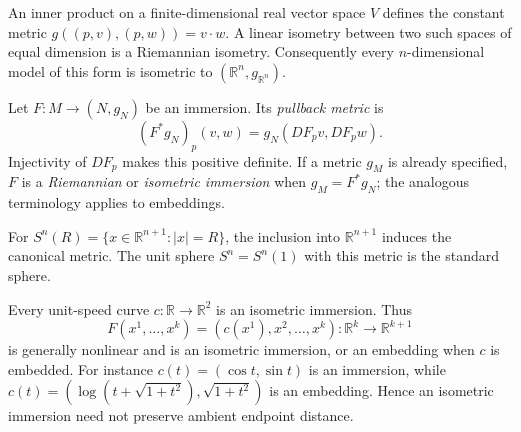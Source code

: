 \begin{example}
  \label{ex:pet-ch1-inner-product-space}


  An inner product on a finite-dimensional real vector space $V$ defines the
  constant metric $g((p,v),(p,w))=v\cdot w$. A linear isometry between two
  such spaces of equal dimension is a Riemannian isometry. Consequently every
  $n$-dimensional model of this form is isometric to
  $(\mathbb{R}^n,g_{\mathbb{R}^n})$.
\end{example}

\begin{definition}
  \label{def:pet-ch1-pullback-metric}


  Let $F:M\to(N,g_N)$ be an immersion. Its \emph{pullback metric} is
  \[
    (F^*g_N)_p(v,w)=g_N(DF_pv,DF_pw).
  \]
  Injectivity of $DF_p$ makes this positive definite. If a metric $g_M$ is
  already specified, $F$ is a \emph{Riemannian} or \emph{isometric immersion}
  when $g_M=F^*g_N$; the analogous terminology applies to embeddings.
\end{definition}

\begin{example}
  \label{ex:pet-ch1-sphere}


  For
  $S^n(R)=\{x\in\mathbb{R}^{n+1}:|x|=R\}$, the inclusion into
  $\mathbb{R}^{n+1}$ induces the canonical metric. The unit sphere
  $S^n=S^n(1)$ with this metric is the standard sphere.
\end{example}

\begin{remark}
  \label{rem:pet-ch1-nonlinear-isometric-immersion}


  Every unit-speed curve $c:\mathbb{R}\to\mathbb{R}^2$ is an isometric
  immersion. Thus
  \[
    F(x^1,\ldots,x^k)=(c(x^1),x^2,\ldots,x^k)
      :\mathbb{R}^k\to\mathbb{R}^{k+1}
  \]
  is generally nonlinear and is an isometric immersion, or an embedding when
  $c$ is embedded. For instance $c(t)=(\cos t,\sin t)$ is an immersion, while
  $c(t)=(\log(t+\sqrt{1+t^2}),\sqrt{1+t^2})$ is an embedding. Hence an
  isometric immersion need not preserve ambient endpoint distance.
\end{remark}

